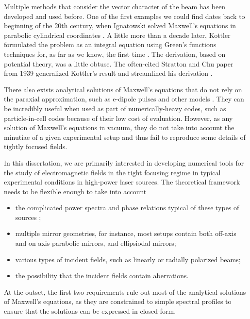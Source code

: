 \documentclass[11pt,SymmetricalJury]{inrsthesis/inrsthesis}
\begin{document}


Multiple methods that consider the vector character of the beam has been
developed and used before. One of the first examples we could find dates back to
beginning of the 20th century, when Ignatowski solved Maxwell's equations in
parabolic cylindrical coordinates \cite{Ignatowsky1907,Ignatowsky1908}. A little
more than a decade later, Kottler formulated the problem as an integral equation
using Green's functions techniques for, as far as we know, the first time
\cite{Kottler1923a,Kottler1923b}. The derivation, based on potential theory, was
a little obtuse. The often-cited Stratton and Chu paper from 1939 generalized
Kottler's result and streamlined his derivation \cite{Stratton1939}.

There also exists analytical solutions of Maxwell's equations that do not rely
on the paraxial approximation, such as e-dipole pulses and other models
\cite{Gonoskov2012,Salamin2015a,Salamin2015b}. They can be incredibly useful
when used as part of numerically-heavy codes, such as particle-in-cell codes
because of their low cost of evaluation. However, as any solution of Maxwell's
equations in vacuum, they do not take into account the minutiae of a given
experimental setup and thus fail to reproduce some details of tightly focused
fields.

In this dissertation, we are primarily interested in developing numerical tools
for the study of electromagnetic fields in the tight focusing regime in typical
experimental conditions in high-power laser sources. The theoretical framework
needs to be flexible enough to take into account
  \begin{itemize}
    \item the complicated power spectra and phase relations
          typical of these types of sources \cite{Jeong2015};
    \item multiple mirror geometries, for instance, most setups contain both
          off-axis and on-axis parabolic mirrors, and ellipsiodal mirrors;
    \item various types of incident fields, such as linearly or radially polarized beams;
    \item the possibility that the incident fields contain aberrations.
  \end{itemize}
At the outset, the first two requirements rule out most of the analytical
solutions of Maxwell's equations, as they are constrained to simple spectral
profiles to ensure that the solutions can be expressed in closed-form.
\end{document}
